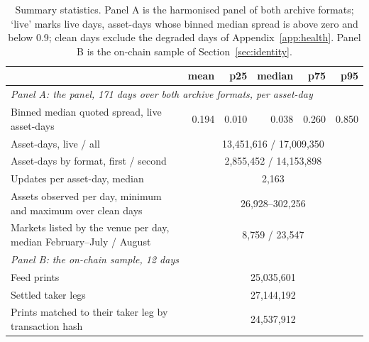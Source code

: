 \begin{table}[htbp]
\centering\footnotesize\setlength{\tabcolsep}{3.5pt}
\begin{tabular}{lrrrrr}
\toprule
& mean & p25 & median & p75 & p95 \\
\midrule
\multicolumn{6}{l}{\textit{Panel A: the panel, 171 days over both archive formats, per asset-day}} \\
Binned median quoted spread, live asset-days & 0.194 & 0.010 & 0.038 & 0.260 & 0.850 \\
Asset-days, live / all & \multicolumn{5}{c}{13{,}451{,}616 / 17{,}009{,}350} \\
Asset-days by format, first / second & \multicolumn{5}{c}{2{,}855{,}452 / 14{,}153{,}898} \\
Updates per asset-day, median & \multicolumn{5}{c}{2{,}163} \\
Assets observed per day, minimum and maximum over clean days & \multicolumn{5}{c}{26{,}928--302{,}256} \\
Markets listed by the venue per day, median February--July / August & \multicolumn{5}{c}{8{,}759 / 23{,}547} \\
\midrule
\multicolumn{6}{l}{\textit{Panel B: the on-chain sample, 12 days}} \\
Feed prints & \multicolumn{5}{c}{25{,}035{,}601} \\
Settled taker legs & \multicolumn{5}{c}{27{,}144{,}192} \\
Prints matched to their taker leg by transaction hash & \multicolumn{5}{c}{24{,}537{,}912} \\
\bottomrule
\end{tabular}
\caption{Summary statistics. Panel A is the harmonised panel of both archive formats; `live' marks live days, asset-days whose binned median spread is above zero and below 0.9; clean days exclude the degraded days of Appendix~\ref{app:health}. Panel B is the on-chain sample of Section~\ref{sec:identity}.}
\label{tab:summary}
\end{table}
